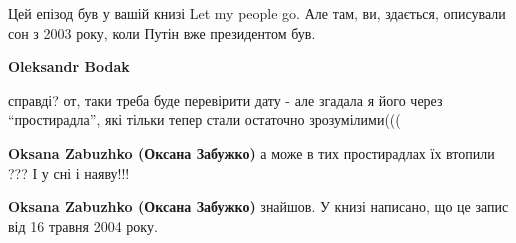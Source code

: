  
 
 
 
 
\zzSecCmt

\begin{itemize} %

Цей епізод був у вашій книзі Let my people go. Але там, ви, здається, описували
сон з 2003 року, коли Путін вже президентом був.

\begin{itemize} %
\textbf{Oleksandr Bodak} 

справді? от, таки треба буде перевірити дату - але згадала я його через
\enquote{простирадла}, які тільки тепер стали остаточно зрозумілими(((

\textbf{Oksana Zabuzhko (Оксана Забужко)} а може в тих простирадлах їх втопили ??? І у сні і наяву!!!

\textbf{Oksana Zabuzhko (Оксана Забужко)} знайшов. У книзі написано, що це запис від 16 травня 2004 року.
\end{itemize} %

\end{itemize} %

